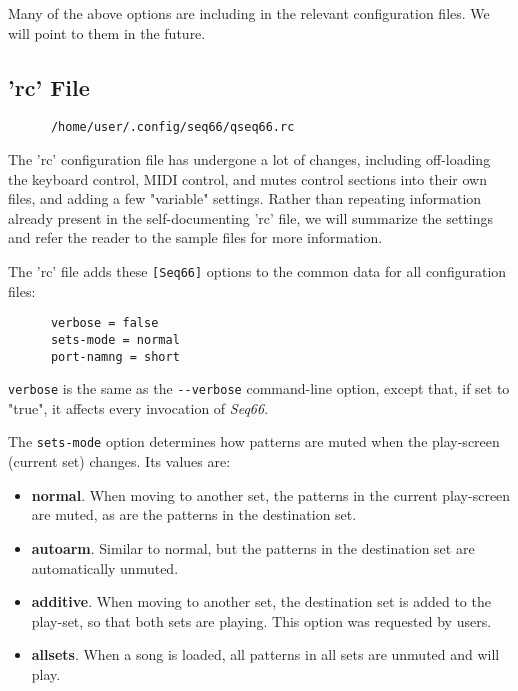       Many of the above options are including in the relevant configuration
      files.  We will point to them in the future.

\subsection{'rc' File}
\label{subsec:configuration_rc}

   \begin{verbatim}
      /home/user/.config/seq66/qseq66.rc
   \end{verbatim}

   The 'rc' configuration file has undergone a lot of changes, including
   off-loading the keyboard control, MIDI control, and mutes control sections
   into their own files, and adding a few "variable" settings.
   Rather than repeating information already present in the self-documenting
   'rc' file, we will summarize the settings and refer the reader to the sample
   files for more information.

   The 'rc' file adds these \texttt{[Seq66]} options to the common
   data for all configuration files:

   \begin{verbatim}
      verbose = false
      sets-mode = normal
      port-namng = short
   \end{verbatim}

   \texttt{verbose} is the same as the \texttt{-{}-verbose} command-line option,
   except that, if set to "true", it affects every invocation of \textsl{Seq66}.

   The \texttt{sets-mode} option determines how patterns are muted when the
   play-screen (current set) changes.  Its values are:

   \begin{itemize}
      \item \textbf{normal}.
         When moving to another set, the patterns in the
         current play-screen are muted, as are the patterns in the destination
         set.
      \item \textbf{autoarm}.
         Similar to normal, but the patterns in the
         destination set are automatically unmuted.
      \item \textbf{additive}.
         When moving to another set, the destination set
         is added to the play-set, so that both sets are playing.
         This option was requested by users.
      \item \textbf{allsets}.
         When a song is loaded, all patterns in all sets are unmuted and will
         play.
   \end{itemize}

